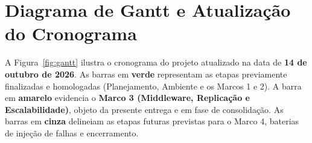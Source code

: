 \documentclass[12pt,a4paper]{article}
\begin{document}
	\section{Diagrama de Gantt e Atualização do Cronograma}
	\label{sec:gantt}
	
	A Figura~\ref{fig:gantt} ilustra o cronograma do projeto atualizado na data de \textbf{14 de outubro de 2026}. As barras em \textbf{verde} representam as etapas previamente finalizadas e homologadas (Planejamento, Ambiente e os Marcos 1 e 2). A barra em \textbf{amarelo} evidencia o \textbf{Marco 3 (Middleware, Replicação e Escalabilidade)}, objeto da presente entrega e em fase de consolidação. As barras em \textbf{cinza} delineiam as etapas futuras previstas para o Marco 4, baterias de injeção de falhas e encerramento.
	
\end{document}
